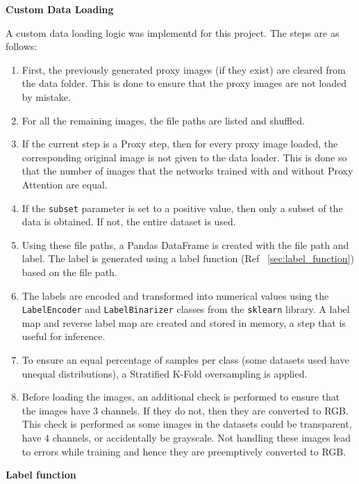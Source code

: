 \documentclass[a4paper,11pt,openright]{book}
\begin{document}
\textbf{Custom Data Loading}

A custom data loading logic was implementd for this project. The steps are as follows:
\begin{enumerate}
    \item First, the previously generated proxy images (if they exist) are cleared from the data folder. This is done to ensure that the proxy images are not loaded by mistake.
    \item For all the remaining images, the file paths are listed and shuffled.
    \item If the current step is a Proxy step, then for every proxy image loaded, the corresponding original image is not given to the data loader. This is done so that the number of images that the networks trained with and without Proxy Attention are equal.
    \item If the \lstinline[language=Python]{subset} parameter is set to a positive value, then only a subset of the data is obtained. If not, the entire dataset is used.
    \item Using these file paths, a Pandas DataFrame is created with the file path and label. The label is generated using a label function (Ref ~\ref{sec:label_function}) based on the file path.
    \item The labels are encoded and transformed into numerical values using the \lstinline[language=Python]{LabelEncoder} and \lstinline[language=Python]{LabelBinarizer} classes from the \lstinline[language=Python]{sklearn} library. A label map and reverse label map are created and stored in memory, a step that is useful for inference.
    \item To ensure an equal percentage of samples per class (some datasets used have unequal distributions), a Stratified K-Fold oversampling is applied.
    \item Before loading the images, an additional check is performed to ensure that the images have 3 channels. If they do not, then they are converted to RGB. This check is performed as some images in the datasets could be transparent, have 4 channels, or accidentally be grayscale. Not handling these images lead to errors while training and hence they are preemptively converted to RGB.
\end{enumerate}

\textbf{Label function} \label{sec:label_function}
\end{document}
